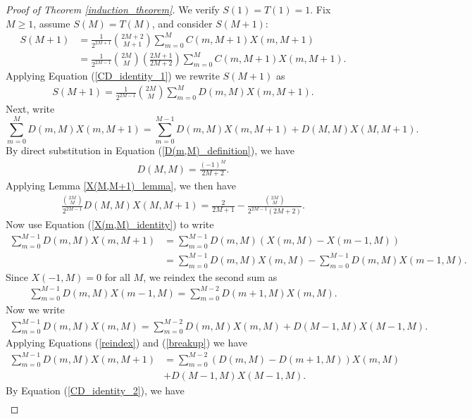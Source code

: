 \documentclass[10pt,a4paper]{amsart}
\begin{document}
\begin{proof}[Proof of Theorem \ref{induction_theorem}]
We verify $S(1) = T(1) =1$.  Fix $M \geq 1$, assume $S(M) = T(M)$, and consider $S(M+1)$:
\begin{align*}
S(M+1) &= \frac{1}{2^{2M+1}} \binom{2M+2}{M+1}\sum_{m=0}^M C(m,M+1)X(m,M+1) \\
&=  \frac{1}{2^{2M-1}} \binom{2M}{M}  \left(\frac{2M+1}{2M+2}\right) \sum_{m=0}^M C(m,M+1)X(m,M+1).
\end{align*}
Applying Equation (\ref{CD_identity_1}) we  rewrite $S(M+1)$ as
\begin{align}\label{S(M+1)_rewritten}
S(M+1) = \frac{1}{2^{2M-1}} \binom{2M}{M} \sum_{m=0}^{M} D(m,M)X(m,M+1).
\end{align}
Next, write
\[
\sum_{m=0}^{M} D(m,M)X(m,M+1) =\sum_{m=0}^{M-1} D(m,M)X(m,M+1) + D(M,M)X(M,M+1).
\]
By direct substitution in Equation (\ref{D(m,M)_definition}), we have 
\begin{align} \label{D(M,M)}
D(M,M) = \frac{(-1)^M}{2M+2}.
\end{align}
Applying Lemma \ref{X(M,M+1)_lemma}, we then have 
\begin{align} \label{D(M,M)X(M,M+1)}
\frac{\binom{2M}{M}}{2^{2M-1}}D(M,M)X(M,M+1) = \frac{2}{2M+1} - \frac{\binom{2M}{M}}{2^{2M-1}(2M+2)}.
\end{align}
Now use Equation (\ref{X(m,M)_identity}) to write
\begin{align*}
\sum_{m=0}^{M-1} D(m,M)X(m,M+1) &= \sum_{m=0}^{M-1} D(m,M)\left(X(m,M) - X(m-1,M)\right) \\
&=\sum_{m=0}^{M-1} D(m,M)X(m,M) - \sum_{m=0}^{M-1} D(m,M)X(m-1,M).
\end{align*}
Since $X(-1,M) = 0$ for all $M$, we reindex the second sum as
\begin{align} \label{reindex}
\sum_{m=0}^{M-1} D(m,M)X(m-1,M) = \sum_{m=0}^{M-2} D(m+1,M)X(m,M).
\end{align}
Now we write
\begin{align} \label{breakup}
\sum_{m=0}^{M-1} D(m,M)X(m,M) = \sum_{m=0}^{M-2} D(m,M)X(m,M) + D(M-1,M)X(M-1,M).
\end{align}
Applying Equations (\ref{reindex}) and (\ref{breakup}) we have
\begin{align*}
\sum_{m=0}^{M-1} D(m,M)X(m,M+1) &= \sum_{m=0}^{M-2}\left(D(m,M) - D(m+1,M)\right)X(m,M) \\
& + D(M-1,M)X(M-1,M).
\end{align*}
By Equation (\ref{CD_identity_2}), we have 
\begin{align} \label{condense}

\end{align}
\end{proof}
\end{document}
